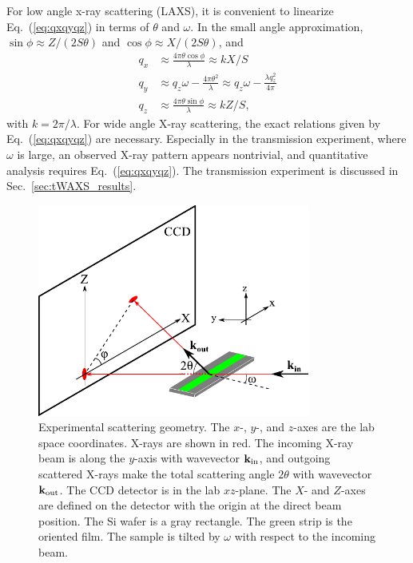 For low angle x-ray scattering (LAXS), 
it is convenient to linearize Eq.~(\ref{eq:qxqyqz})
in terms of $\theta$ and $\omega$. In the small angle approximation, 
$\sin\phi \approx Z/(2S\theta)$ and $\cos\phi \approx X/(2S\theta)$, and
\begin{align}
  q_x &\approx \frac{4\pi\theta\cos\phi}{\lambda} \approx kX/S \nonumber\\
  q_y &\approx q_z\omega -\frac{4\pi\theta^2}{\lambda} \approx q_z\omega - \frac{\lambda q_z^2}{4\pi}\nonumber\\
  q_z &\approx \frac{4\pi\theta\sin\phi}{\lambda} \approx kZ/S,
  \label{eq:qxqyqz_small}
\end{align}
with $k=2\pi/\lambda$. For wide angle X-ray scattering, the exact relations given
by Eq.~(\ref{eq:qxqyqz}) are necessary. Especially in the transmission experiment,
where $\omega$ is large, an observed X-ray pattern appears nontrivial, and 
quantitative analysis requires Eq.~(\ref{eq:qxqyqz}).
The transmission experiment is discussed in Sec.~\ref{sec:tWAXS_results}.

\begin{figure}[htbp]
  \centering
  \includegraphics[width=0.8\textwidth]{figures/ripple/analysis/laxs_setup}
  \caption[Experimental scattering geometry]
  {Experimental scattering geometry.
  The $x$-, $y$-, and $z$-axes 
  are the lab space coordinates. 
  X-rays are shown in red. The incoming X-ray beam is along the $y$-axis with
  wavevector $\mathbf{k}_{\mathrm{in}}$, and outgoing scattered X-rays make the total scattering
  angle $2\theta$ with wavevector $\mathbf{k}_{\mathrm{out}}$.
  The CCD detector is in the lab $xz$-plane. The $X$- and $Z$-axes are 
  defined on the detector with the origin at the direct beam position. 
  The Si wafer is a gray rectangle.
  The green strip is the oriented film. The sample is tilted by $\omega$
  with respect to the incoming beam. 
  }
  \label{fig:laxs_setup}
\end{figure}

